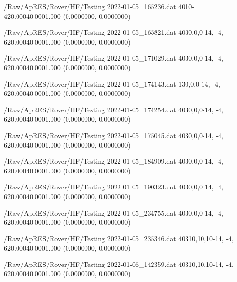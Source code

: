 \hfaprestable
{/Raw/ApRES/Rover/HF/Testing}%
{2022-01-05\_165236.dat}%
{40}{1}{0}{-4}{20.000}{40.000}{1.000}%
{ (0.0000000, 0.0000000)}%
{}%
{}%

\hfaprestable
{/Raw/ApRES/Rover/HF/Testing}%
{2022-01-05\_165821.dat}%
{40}{3}{0,0,0}{-14, -4,  6}{20.000}{40.000}{1.000}%
{ (0.0000000, 0.0000000)}%
{}%
{}%

\hfaprestable
{/Raw/ApRES/Rover/HF/Testing}%
{2022-01-05\_171029.dat}%
{40}{3}{0,0,0}{-14, -4,  6}{20.000}{40.000}{1.000}%
{ (0.0000000, 0.0000000)}%
{}%
{}%

\hfaprestable
{/Raw/ApRES/Rover/HF/Testing}%
{2022-01-05\_174143.dat}%
{1}{3}{0,0,0}{-14, -4,  6}{20.000}{40.000}{1.000}%
{ (0.0000000, 0.0000000)}%
{}%
{}%

\hfaprestable
{/Raw/ApRES/Rover/HF/Testing}%
{2022-01-05\_174254.dat}%
{40}{3}{0,0,0}{-14, -4,  6}{20.000}{40.000}{1.000}%
{ (0.0000000, 0.0000000)}%
{}%
{}%

\hfaprestable
{/Raw/ApRES/Rover/HF/Testing}%
{2022-01-05\_175045.dat}%
{40}{3}{0,0,0}{-14, -4,  6}{20.000}{40.000}{1.000}%
{ (0.0000000, 0.0000000)}%
{}%
{}%

\hfaprestable
{/Raw/ApRES/Rover/HF/Testing}%
{2022-01-05\_184909.dat}%
{40}{3}{0,0,0}{-14, -4,  6}{20.000}{40.000}{1.000}%
{ (0.0000000, 0.0000000)}%
{}%
{}%

\hfaprestable
{/Raw/ApRES/Rover/HF/Testing}%
{2022-01-05\_190323.dat}%
{40}{3}{0,0,0}{-14, -4,  6}{20.000}{40.000}{1.000}%
{ (0.0000000, 0.0000000)}%
{}%
{}%

\hfaprestable
{/Raw/ApRES/Rover/HF/Testing}%
{2022-01-05\_234755.dat}%
{40}{3}{0,0,0}{-14, -4,  6}{20.000}{40.000}{1.000}%
{ (0.0000000, 0.0000000)}%
{}%
{}%

\hfaprestable
{/Raw/ApRES/Rover/HF/Testing}%
{2022-01-05\_235346.dat}%
{40}{3}{10,10,10}{-14, -4,  6}{20.000}{40.000}{1.000}%
{ (0.0000000, 0.0000000)}%
{}%
{}%

\hfaprestable
{/Raw/ApRES/Rover/HF/Testing}%
{2022-01-06\_142359.dat}%
{40}{3}{10,10,10}{-14, -4,  6}{20.000}{40.000}{1.000}%
{ (0.0000000, 0.0000000)}%
{}%
{}%

